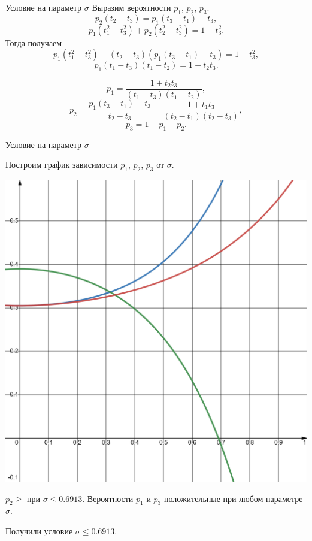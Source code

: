 \documentclass[ucs, notheorems, handout]{beamer}
\begin{document}
\begin{frame}{Условие на параметр $\sigma$}
	Выразим вероятности $p_{1}$, $p_{2}$, $p_{3}$.
	\[p_{2}(t_{2}-t_{3})=p_{1}(t_{3}-t_{1})-t_{3},\]
	\[p_{1}(t_{1}^{2}-t_{3}^{2}) + p_{2}(t_{2}^{2} - t_{3}^{2})=1-t_{3}^{2}.\]
	Тогда получаем
	\[p_{1}(t_{1}^{2}-t_{3}^{2}) + (t_{2}+t_{3})(p_{1}(t_{3}-t_{1})-t_{3})=1-t_{3}^{2},\]
	\[p_{1}(t_{1}-t_{3})(t_{1}-t_{2})=1+t_{2}t_{3}.\]
	
		\[p_{1} = \dfrac{1+t_{2}t_{3}}{(t_{1}-t_{3})(t_{1}-t_{2})},\] 
		\[p_{2} = \dfrac{p_{1}(t_{3}-t_{1})-t_{3}}{t_{2}-t_{3}}=\dfrac{1+t_{1}t_{3}}{(t_{2}-t_{1})(t_{2}-t_{3})},\] 
		\[p_{3} = 1-p_{1}-p_{2}.\]

	
\end{frame}

\begin{frame}{Условие на параметр $\sigma$}
	
	Построим график зависимости $p_{1}$, $p_{2}$, $p_{3}$ от $\sigma$.
	
	\begin{center}
		\includegraphics[scale=0.08]{prob.png}
	\end{center}
	
	$p_{2}\geq$ при $\sigma\leq 0.6913$. Вероятности $p_{1}$ и $p_{3}$ положительные при любом параметре $\sigma$.
	
	Получили условие $\sigma\leq 0.6913$.
	
\end{frame}
\end{document}
